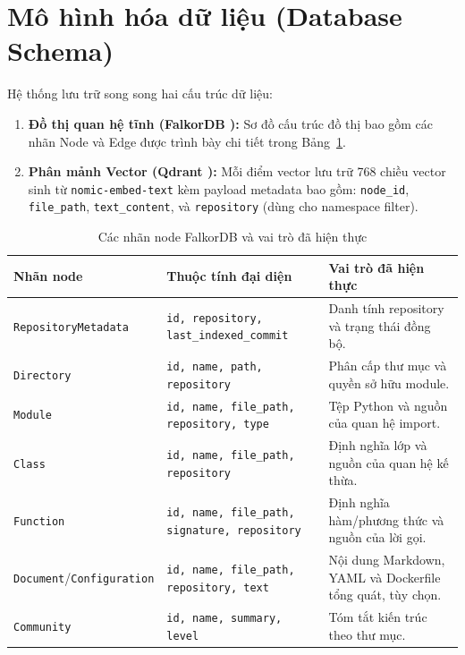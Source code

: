 \documentclass[12pt,a4paper,oneside]{report}
\begin{document}
\section{Mô hình hóa dữ liệu (Database Schema)}
Hệ thống lưu trữ song song hai cấu trúc dữ liệu:
\begin{enumerate}
    \item \textbf{Đồ thị quan hệ tĩnh (FalkorDB \cite{falkordb2024}):} Sơ đồ cấu trúc đồ thị bao gồm các nhãn Node và Edge được trình bày chi tiết trong Bảng~\ref{tab:graph_schema}.
    \item \textbf{Phân mảnh Vector (Qdrant \cite{qdrant2024}):} Mỗi điểm vector lưu trữ 768 chiều vector sinh từ \texttt{nomic-embed-text} \cite{nussbaum2024nomic} kèm payload metadata bao gồm: \texttt{node\_id}, \texttt{file\_path}, \texttt{text\_content}, và \texttt{repository} (dùng cho namespace filter).
\end{enumerate}

\begin{table}[H]
    \centering
    \caption{Các nhãn node FalkorDB và vai trò đã hiện thực}
    \label{tab:graph_schema}
    \small
    \begin{tabular}{p{3.1cm}p{4.5cm}p{5.5cm}}
        \toprule
        \textbf{Nhãn node} & \textbf{Thuộc tính đại diện} & \textbf{Vai trò đã hiện thực} \\
        \midrule
        \texttt{RepositoryMetadata} & \texttt{id, repository, last\_indexed\_commit} & Danh tính repository và trạng thái đồng bộ. \\
        \texttt{Directory} & \texttt{id, name, path, repository} & Phân cấp thư mục và quyền sở hữu module. \\
        \texttt{Module} & \texttt{id, name, file\_path, repository, type} & Tệp Python và nguồn của quan hệ import. \\
        \texttt{Class} & \texttt{id, name, file\_path, repository} & Định nghĩa lớp và nguồn của quan hệ kế thừa. \\
        \texttt{Function} & \texttt{id, name, file\_path, signature, repository} & Định nghĩa hàm/phương thức và nguồn của lời gọi. \\
        \texttt{Document}/\texttt{Configuration} & \texttt{id, name, file\_path, repository, text} & Nội dung Markdown, YAML và Dockerfile tổng quát, tùy chọn. \\
        \texttt{Community} & \texttt{id, name, summary, level} & Tóm tắt kiến trúc theo thư mục. \\
        \bottomrule
    \end{tabular}
\end{table}
\end{document}
